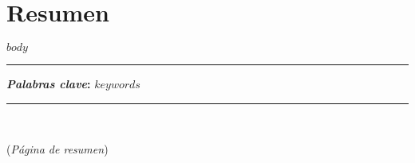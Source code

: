 \chapter*{Resumen} %
  $body$
\noindent \rule{0.9\textwidth}{1.0pt} \newline
\noindent \textbf{\textit{Palabras clave}: }\newline
  $keywords$
\noindent \rule{0.9\textwidth}{1.0pt}
\ \newline
\par
\linespread{1.3}
{\Huge{(\textit{Página de resumen})}}
\clearpage %
